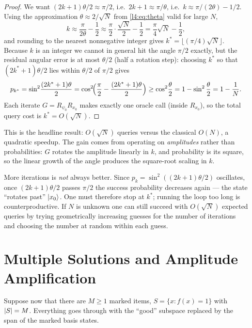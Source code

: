 \begin{proof}
We want $(2k+1)\theta/2\approx\pi/2$, i.e.\ $2k+1\approx\pi/\theta$, i.e.\
$k\approx\pi/(2\theta)-1/2$. Using the approximation
$\theta\approx2/\sqrt N$ from \eqref{l4:eq:theta} valid for large $N$,
\[
  k\approx\frac{\pi}{2\theta}-\frac12\approx\frac{\pi}{2}\cdot\frac{\sqrt N}{2}-\frac12
     =\frac{\pi}{4}\sqrt N-\frac12,
\]
and rounding to the nearest nonnegative integer gives
$k^{\ast}=\lfloor(\pi/4)\sqrt N\rfloor$. Because $k$ is an integer we cannot in
general hit the angle $\pi/2$ exactly, but the residual angular error is at most
$\theta/2$ (half a rotation step): choosing $k^{\ast}$ so that
$(2k^{\ast}+1)\theta/2$ lies within $\theta/2$ of $\pi/2$ gives
\[
  p_{k^{\ast}}=\sin^{2}\!\frac{(2k^{\ast}+1)\theta}{2}
    =\cos^{2}\!\Bigl(\frac{\pi}{2}-\frac{(2k^{\ast}+1)\theta}{2}\Bigr)
    \ge\cos^{2}\!\frac{\theta}{2}=1-\sin^{2}\frac{\theta}{2}=1-\frac1N.
\]
Each iterate $G=R_{\psi_0}R_{x_0}$ makes exactly one oracle call (inside
$R_{x_0}$), so the total query cost is $k^{\ast}=O(\sqrt N)$.
\end{proof}

This is the headline result: $O(\sqrt N)$ queries versus the classical $O(N)$, a
quadratic speedup. The gain comes from operating on \emph{amplitudes} rather than
probabilities: $G$ rotates the amplitude linearly in $k$, and probability is its
square, so the linear growth of the angle produces the square-root scaling in $k$.

\begin{remark}
More iterations is \emph{not} always better. Since $p_k=\sin^{2}((2k+1)\theta/2)$
oscillates, once $(2k+1)\theta/2$ passes $\pi/2$ the success probability decreases
again --- the state ``rotates past'' $\ket{x_0}$. One must therefore stop at
$k^{\ast}$; running the loop too long is counterproductive. If $N$ is unknown one
can still succeed with $O(\sqrt N)$ expected queries by trying geometrically
increasing guesses for the number of iterations and choosing the number at random
within each guess.
\end{remark}

\section{Multiple Solutions and Amplitude Amplification}

Suppose now that there are $M\ge1$ marked items, $S=\{x:f(x)=1\}$ with $\lvert S\rvert=M$.
Everything goes through with the ``good'' subspace replaced by the span of the
marked basis states.

